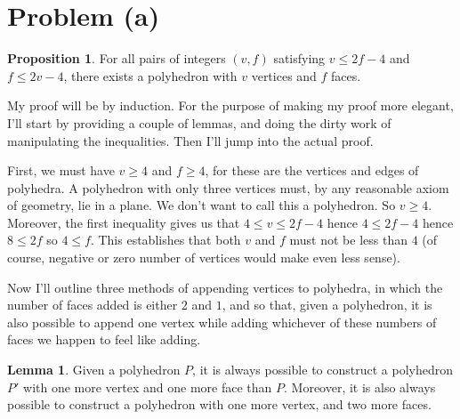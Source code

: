 \documentclass[12pt]{article}
\theoremstyle{definition}
\newtheorem{lemma}{Lemma}
\newtheorem{proposition}{Proposition}
\begin{document}
\section{Problem (a)}

\begin{proposition}
For all pairs of integers $(v,f)$ satisfying $v\le 2f-4$ and $f\le 2v-4 $, there exists a polyhedron with $v$ vertices and $f$ faces.
\end{proposition}

My proof will be by induction. For the purpose of making my proof more elegant, I'll start by providing a couple of lemmas, and doing the dirty work of manipulating the inequalities. Then I'll jump into the actual proof.

First, we must have $v\ge 4$ and $f\ge 4$, for these are the vertices and edges of polyhedra. A polyhedron with only three vertices must, by any reasonable axiom of geometry, lie in a plane. We don't want to call this a polyhedron. So $v \ge 4$. Moreover, the first inequality gives us that $ 4\le v \le 2f-4 $ hence $ 4\le 2f-4$ hence $8 \le 2f$ so $ 4 \le f $. This establishes that both $v$ and $f$ must not be less than $4$ (of course, negative or zero number of vertices would make even less sense).

Now I'll outline three methods of appending vertices to polyhedra, in which the number of faces added is either $2$ and $1$, and so that, given a polyhedron, it is also possible to append one vertex while adding whichever of these numbers of faces we happen to feel like adding.

\begin{lemma}
Given a polyhedron $P$, it is always possible to construct a polyhedron $P'$ with one more vertex and one more face than $P$. Moreover, it is also always possible to construct a polyhedron with one more vertex, and two more faces.
\end{lemma}
\end{document}
